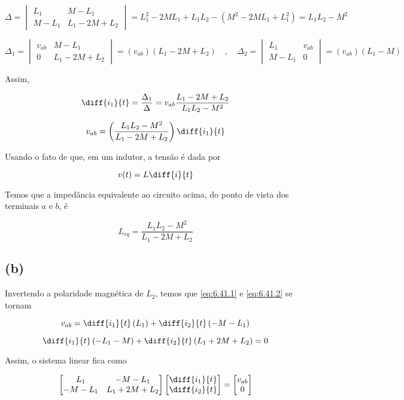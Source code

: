 \begingroup
\renewcommand*{\arraystretch}{1.5}

\[ 
    \Delta
    =
    \begin{vmatrix}
        L_1 & M - L_1    \\
        M - L_1    & L_1 - 2M + L_2
    \end{vmatrix}
    =
    L_1^2 - 2ML_1 + L_1L_2 - (M^2 - 2ML_1 + L_1^2)
    =
    L_1L_2 - M^2
\]

\[ 
    \Delta_1
    =
    \begin{vmatrix}
        v_{ab} & M - L_1    \\
        0    & L_1 - 2M + L_2
    \end{vmatrix}
    =
    (v_{ab})(L_1 - 2M + L_2) \quad , \quad
    \Delta_2
    =
    \begin{vmatrix}
        L_1 & v_{ab}   \\
        M - L_1    & 0
    \end{vmatrix}
    =
    (v_{ab})(L_1 - M)
\]

\endgroup

Assim, 

\[ \diff{i_1}{t} = \frac{\Delta_1}{\Delta} = v_{ab}\frac{L_1 - 2M + L_2}{L_1L_2 - M^2} \]

\[ v_{ab} =  \left(\frac{L_1L_2 - M^2}{L_1 - 2M + L_2}\right)\diff{i_1}{t} \]

Usando o fato de que, em um indutor, a tensão é dada por 

\[ v(t) = L\diff{i}{t} \]

Temos que a impedância equivalente ao circuito acima, do ponto de vista dos terminais $a$ e $b$, é

\[ \boxed{L_{eq} = \frac{L_1L_2 - M^2}{L_1 - 2M + L_2}}  \]

\subsection*{(b)}

Invertendo a polaridade magnética de $L_2$, temos que \eqref{eq:6.41.1} e \eqref{eq:6.41.2} se tornam

\[ v_{ab} = \diff{i_1}{t}\left(L_1\right) + \diff{i_2}{t}\left(- M - L_1\right) \]

\[ \diff{i_1}{t}\left(-L_1 - M\right) + \diff{i_2}{t}\left(L_1 + 2M + L_2\right) = 0 \]

Assim, o sistema linear fica como

\begingroup
\renewcommand*{\arraystretch}{2}

\[
    \begin{bmatrix}
        L_1 & - M - L_1    \\
        - M - L_1    & L_1 + 2M + L_2
    \end{bmatrix}
    \begin{bmatrix}
        \diff{i_1}{t} \\
        \diff{i_2}{t}
    \end{bmatrix}
    =
    \begin{bmatrix}
        v_{ab} \\
        0
    \end{bmatrix}
\]

